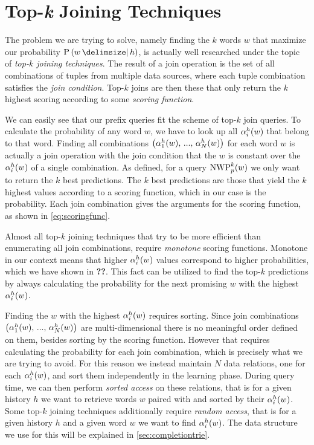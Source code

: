 \section{Top-\emph{k} Joining Techniques}
\label{sec:topkjoin}

The problem we are trying to solve, namely finding the $k$ words $w$ that
maximize our probability $\Prob{w}{h}$, is actually well researched under the
topic of \emph{top-$k$ joining techniques}.
The result of a join operation is the set of all combinations of tuples from
multiple data sources, where each tuple combination satisfies the \emph{join
condition}.
Top-$k$ joins are then these that only return the $k$ highest scoring
according to some \emph{scoring function}.

We can easily see that our prefix queries fit the scheme of top-$k$ join
queries.
To calculate the probability of any word $w$, we have to look up all
$\alpha^h_i(w)$ that belong to that word.
Finding all combinations
$\left(\alpha^h_1(w), \, ..., \, \alpha^h_N(w)\right)$
for each word $w$ is actually a join operation with the join condition that
the $w$ is constant over the $\alpha^h_i(w)$ of a single combination.
As defined, for a query $\NWP[p][k]{w}$ we only want to return the $k$ best
predictions.
The $k$ best predictions are those that yield the $k$ highest values according
to a scoring function, which in our case is the probability.
Each join combination gives the arguments for the scoring function, as shown
in \cref{eq:scoringfunc}.

Almost all top-$k$ joining techniques that try to be more efficient than
enumerating all join combinations, require \emph{monotone} scoring functions.
Monotone in our context means that higher $\alpha^h_i(w)$ values correspond
to higher probabilities, which we have shown in \textbf{??}.
This fact can be utilized to find the top-$k$ predictions by always calculating
the probability for the next promising $w$ with the highest $\alpha^h_i(w)$.

Finding the $w$ with the highest $\alpha^h_i(w)$ requires sorting.
Since join combinations
$\left(\alpha^h_1(w), \, ..., \, \alpha^h_N(w)\right)$ are multi-dimensional
there is no meaningful order defined on them, besides sorting by the scoring
function.
However that requires calculating the probability for each join
combination, which is precisely what we are trying to avoid.
For this reason we instead maintain $N$ data relations, one for each
$\alpha^h_i(w)$, and sort them independently in the learning phase.
During query time, we can then perform \emph{sorted access} on these relations,
that is for a given history $h$ we want to retrieve words $w$ paired with and
sorted by their $\alpha^h_i(w)$.
Some top-$k$ joining techniques additionally require \emph{random access},
that is for a given history $h$ and a given word $w$ we want to find
$\alpha^h_i(w)$.
The data structure we use for this will be explained in
\cref{sec:completiontrie}.

